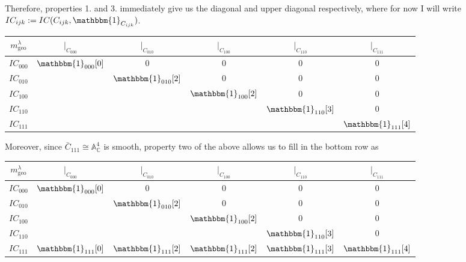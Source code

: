 \documentclass{memoir}
\newcommand{\ba}{\mathbb{A}}
\newcommand{\bc}{\mathbb{C}}
\newcommand{\tx}{\text}
\theoremstyle{definition}
\begin{document}
	Therefore, properties 1. and 3. immediately give us the diagonal and upper diagonal respectively, where for now I will write $IC_{ijk}:=IC(C_{ijk}, \mathbbm{1}_{C_{ijk}})$.  
		\begin{center}
		\begin{tabular}{ c | c c c c c}
			$m_{\tx{geo}}^\lambda$ & $|_{C_{000}}$ & $|_{C_{010}}$ & $|_{C_{100}}$ & $|_{C_{110}}$ & $|_{C_{111}}$ \\
			\hline 
			$IC_{000}$ & $\mathbbm{1}_{000}[0]$ & 0 & 0 & 0 & 0\\
			$IC_{010}$ &  & $\mathbbm{1}_{010}[2]$ & 0 & 0 & 0 \\
			$IC_{100}$ &  &  & $\mathbbm{1}_{100}[2]$ & 0 & 0 \\
			$IC_{110}$ &  &  &  & $\mathbbm{1}_{110}[3]$ & 0 \\
			$IC_{111}$ &  &  &   &   & $\mathbbm{1}_{111}[4]$ \\
		\end{tabular}
	\end{center}
	
	Moreover, since $\bar{C}_{111}\cong\ba_{\bc}^4$ is smooth, property two of the above allows us to fill in the bottom row as
	\begin{center}
		\begin{tabular}{ c | c c c c c}
			$m_{\tx{geo}}^\lambda$ & $|_{C_{000}}$ & $|_{C_{010}}$ & $|_{C_{100}}$ & $|_{C_{110}}$ & $|_{C_{111}}$ \\
			\hline 
			$IC_{000}$ & $\mathbbm{1}_{000}[0]$ & 0 & 0 & 0 & 0\\
			$IC_{010}$ &  & $\mathbbm{1}_{010}[2]$ & 0 & 0 & 0 \\
			$IC_{100}$ &  &  & $\mathbbm{1}_{100}[2]$ & 0 & 0 \\
			$IC_{110}$ &  &  &  & $\mathbbm{1}_{110}[3]$ & 0 \\
			$IC_{111}$ & $\mathbbm{1}_{111}[0]$ & $\mathbbm{1}_{111}[2]$ & $\mathbbm{1}_{111}[2]$ & $\mathbbm{1}_{111}[3]$ & $\mathbbm{1}_{111}[4]$ \\
		\end{tabular}
	\end{center}
	
\end{document}
